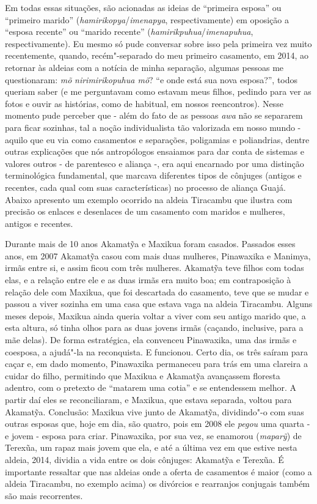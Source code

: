 Em todas essas situações, são acionadas as ideias de ``primeira esposa''
ou ``primeiro marido'' (\emph{hamirikopya}/\emph{imenapya},
respectivamente) em oposição a ``esposa recente'' ou ``marido recente''
(\emph{hamirikpuhua}/\emph{imenapuhua}, respectivamente). Eu mesmo só
pude conversar sobre isso pela primeira vez muito recentemente, quando,
recém"-separado do meu primeiro casamento, em 2014, ao retornar às
aldeias com a notícia de minha separação, algumas pessoas me
questionaram: \emph{mõ} \emph{nirimirikopuhua mõ}? ``e onde está sua
nova esposa?'', todos queriam saber (e me perguntavam como estavam meus
filhos, pedindo para ver as fotos e ouvir as histórias, como de
habitual, em nossos reencontros). Nesse momento pude perceber que - além
do fato de as pessoas \emph{awa} não se separarem para ficar sozinhas,
tal a noção individualista tão valorizada em nosso mundo - aquilo que eu
via como casamentos e separações, poligamias e poliandrias, dentre
outras explicações que nós antropólogos ensaiamos para dar conta de
sistemas e valores outros - de parentesco e aliança -, era aqui
encarnado por uma distinção terminológica fundamental, que marcava
diferentes tipos de cônjuges (antigos e recentes, cada qual com suas
características) no processo de aliança Guajá. Abaixo apresento um
exemplo ocorrido na aldeia Tiracambu que ilustra com precisão os enlaces
e desenlaces de um casamento com maridos e mulheres, antigos e recentes.

Durante mais de 10 anos Akamatỹa e Maxikua foram casados. Passados esses
anos, em 2007 Akamatỹa casou com mais duas mulheres, Pinawaxika e
Manimya, irmãs entre si, e assim ficou com três mulheres. Akamatỹa teve
filhos com todas elas, e a relação entre ele e as duas irmãs era muito
boa; em contraposição à relação dele com Maxikua, que foi descartada do
casamento, teve que se mudar e passou a viver sozinha em uma casa que
estava vaga na aldeia Tiracambu. Alguns meses depois, Maxikua ainda
queria voltar a viver com seu antigo marido que, a esta altura, só tinha
olhos para as duas jovens irmãs (caçando, inclusive, para a mãe delas).
De forma estratégica, ela convenceu Pinawaxika, uma das irmãs e
coesposa, a ajudá"-la na reconquista. E funcionou. Certo dia, os três
saíram para caçar e, em dado momento, Pinawaxika permaneceu para trás em
uma clareira a cuidar do filho, permitindo que Maxikua e Akamatỹa
avançassem floresta adentro, com o pretexto de ``matarem uma cotia'' e se
entendessem melhor. A partir daí eles se reconciliaram, e Maxikua, que
estava separada, voltou para Akamatỹa. Conclusão: Maxikua vive junto de
Akamatỹa, dividindo"-o com suas outras esposas que, hoje em dia, são
quatro, pois em 2008 ele \emph{pegou} uma quarta - e jovem - esposa para
criar. Pinawaxika, por sua vez, se enamorou (\emph{maparỹ}) de Terexũa,
um rapaz mais jovem que ela, e até a última vez em que estive nesta
aldeia, 2014, dividia a vida entre os dois cônjuges: Akamatỹa e Terexũa.
É importante ressaltar que nas aldeias onde a oferta de casamentos é
maior (como a aldeia Tiracambu, no exemplo acima) os divórcios e
rearranjos conjugais também são mais recorrentes.

